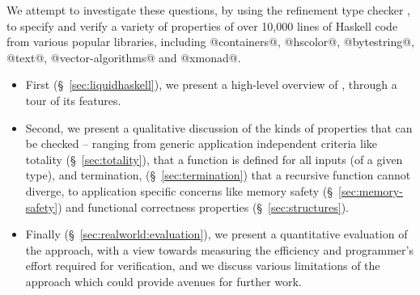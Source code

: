 We attempt to investigate these questions, by using the
refinement type checker \toolname, to specify and verify a variety of 
properties of over 10,000 lines of Haskell code from various popular 
libraries, including @containers@, \hbox{@hscolor@,} @bytestring@, @text@, 
@vector-algorithms@ and @xmonad@. 
%
\begin{itemize}
\item First (\S~\ref{sec:liquidhaskell}), 
we present a high-level overview of \toolname, through a tour 
of its features.
%

\item Second, we present a qualitative discussion of the kinds of properties
that can be checked -- ranging from generic application independent 
criteria like totality (\S~\ref{sec:totality}), 
\ie that a function is defined for all inputs (of a given type),  
and termination, 
(\S~\ref{sec:termination}) 
\ie that a recursive function cannot diverge,
to application specific concerns like memory safety (\S~\ref{sec:memory-safety}) 
and functional correctness properties (\S~\ref{sec:structures}).
%
\item Finally (\S~\ref{sec:realworld:evaluation}), we present a quantitative evaluation of the approach, with a view
towards measuring the efficiency and programmer's effort required for
verification, 
and we discuss various limitations of the approach which could
provide avenues for further work.
\end{itemize}
